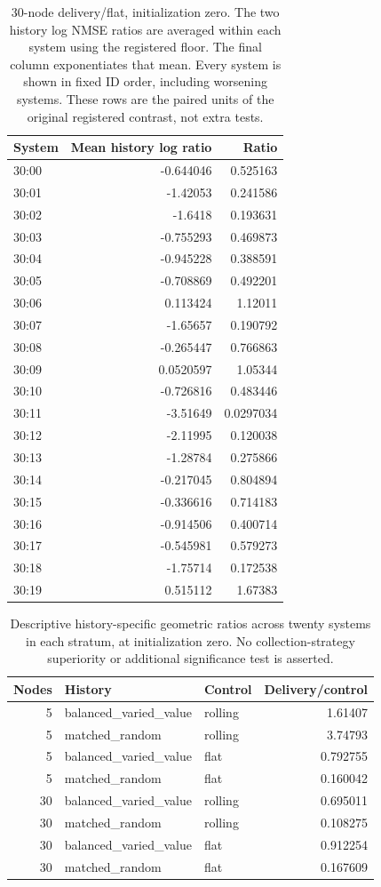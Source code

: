 \begin{table}[ht]
\centering\scriptsize
\begin{tabular}{lrr}
\toprule
System & Mean history log ratio & Ratio\\
\midrule
30:00 & -0.644046 & 0.525163\\
30:01 & -1.42053 & 0.241586\\
30:02 & -1.6418 & 0.193631\\
30:03 & -0.755293 & 0.469873\\
30:04 & -0.945228 & 0.388591\\
30:05 & -0.708869 & 0.492201\\
30:06 & 0.113424 & 1.12011\\
30:07 & -1.65657 & 0.190792\\
30:08 & -0.265447 & 0.766863\\
30:09 & 0.0520597 & 1.05344\\
30:10 & -0.726816 & 0.483446\\
30:11 & -3.51649 & 0.0297034\\
30:12 & -2.11995 & 0.120038\\
30:13 & -1.28784 & 0.275866\\
30:14 & -0.217045 & 0.804894\\
30:15 & -0.336616 & 0.714183\\
30:16 & -0.914506 & 0.400714\\
30:17 & -0.545981 & 0.579273\\
30:18 & -1.75714 & 0.172538\\
30:19 & 0.515112 & 1.67383\\
\bottomrule
\end{tabular}
\caption{30-node delivery/flat, initialization zero. The two history log NMSE ratios are averaged within each system using the registered floor. The final column exponentiates that mean. Every system is shown in fixed ID order, including worsening systems. These rows are the paired units of the original registered contrast, not extra tests.}
\end{table}
\begin{table}[ht]
\centering\small
\begin{tabular}{rllr}
\toprule
Nodes & History & Control & Delivery/control\\
\midrule
5 & balanced\_varied\_value & rolling & 1.61407\\
5 & matched\_random & rolling & 3.74793\\
5 & balanced\_varied\_value & flat & 0.792755\\
5 & matched\_random & flat & 0.160042\\
30 & balanced\_varied\_value & rolling & 0.695011\\
30 & matched\_random & rolling & 0.108275\\
30 & balanced\_varied\_value & flat & 0.912254\\
30 & matched\_random & flat & 0.167609\\
\bottomrule
\end{tabular}
\caption{Descriptive history-specific geometric ratios across twenty systems in each stratum, at initialization zero. No collection-strategy superiority or additional significance test is asserted.}
\end{table}
